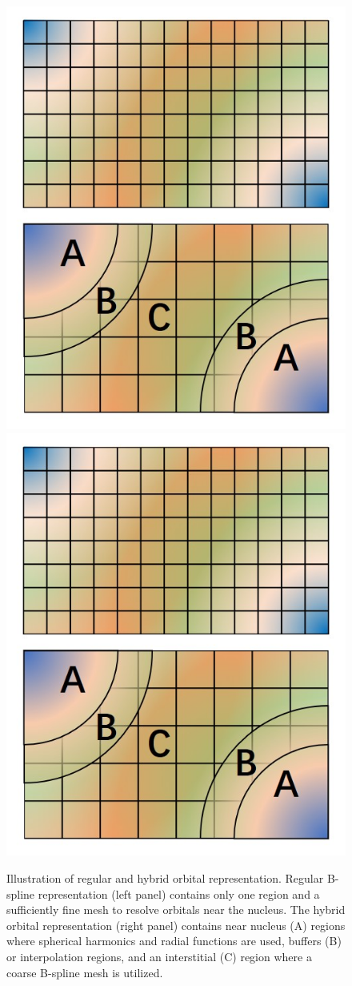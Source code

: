 \begin{figure}
\centering
\includegraphics[trim={0 152 0 0},clip,width=0.45\columnwidth]{./figures/hybrid_new.jpg}
\qquad
\includegraphics[trim={0 2 0 150},clip,width=0.45\columnwidth]{./figures/hybrid_new.jpg}
\caption{Illustration of regular and hybrid orbital representation. Regular B-spline representation (left panel) contains only one region and a sufficiently fine mesh to resolve orbitals near the nucleus. The hybrid orbital representation (right panel) contains near nucleus (A) regions where spherical harmonics and radial functions are used, buffers (B) or interpolation regions, and an interstitial (C) region where a coarse B-spline mesh is utilized.}
\label{fig:hybridrep}
\end{figure}

